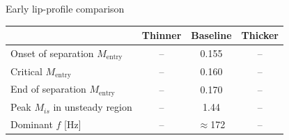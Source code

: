 



\begin{frame}{Early lip-profile comparison}
  \centering
  {\small
  \begin{tabular}{@{}lccc@{}}\toprule
     & Thinner & Baseline & Thicker\\\midrule
    Onset of separation $M_{\mathrm{entry}}$ & -- & 0.155 & --\\
    Critical $M_{\mathrm{entry}}$ & -- & 0.160 & --\\
    End of separation $M_{\mathrm{entry}}$ & -- & 0.170 & --\\
    Peak $M_{is}$ in unsteady region & -- & 1.44 & --\\
    Dominant $f$ [Hz] & -- & $\approx$172 & --\\
  \end{tabular}}\\[6pt]
\end{frame}
